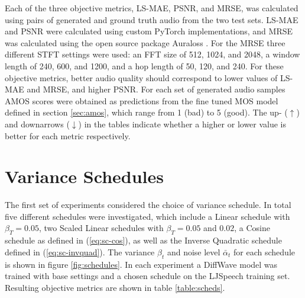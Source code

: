 \documentclass{report}
\begin{document}
Each of the three objective metrics, LS-MAE, PSNR, and MRSE, was calculated using pairs of generated and ground truth audio from the two test sets. LS-MAE and PSNR were calculated using custom PyTorch implementations, and MRSE was calculated using the open source package Auraloss \cite{steinmetz2020auraloss}. For the MRSE three different STFT settings were used: an FFT size of 512, 1024, and 2048, a window length of 240, 600, and 1200, and a hop length of 50, 120, and 240. For these objective metrics, better audio quality should correspond to lower values of LS-MAE and MRSE, and higher PSNR. For each set of generated audio samples AMOS scores were obtained as predictions from the fine tuned MOS model defined in section \ref{sec:amos}, which range from 1 (bad) to 5 (good). The up- ($\uparrow$) and downarrows ($\downarrow$) in the tables indicate whether a higher or lower value is better for each metric respectively. 

\section{Variance Schedules} \label{sec:varscheds}
The first set of experiments considered the choice of variance schedule. In total five different schedules were investigated, which include a Linear schedule with $\beta_T=0.05$, two Scaled Linear schedules with $\beta_T=0.05$ and $0.02$, a Cosine schedule as defined in (\ref{eq:sc-cos}), as well as the Inverse Quadratic schedule defined in (\ref{eq:sc-invquad}). The variance $\beta_t$ and noise level $\bar{\alpha}_t$ for each schedule is shown in figure \ref{fig:schedules}. In each experiment a DiffWave model was trained with base settings and a chosen schedule on the LJSpeech training set. Resulting objective metrics are shown in table \ref{table:scheds}. 
\end{document}
